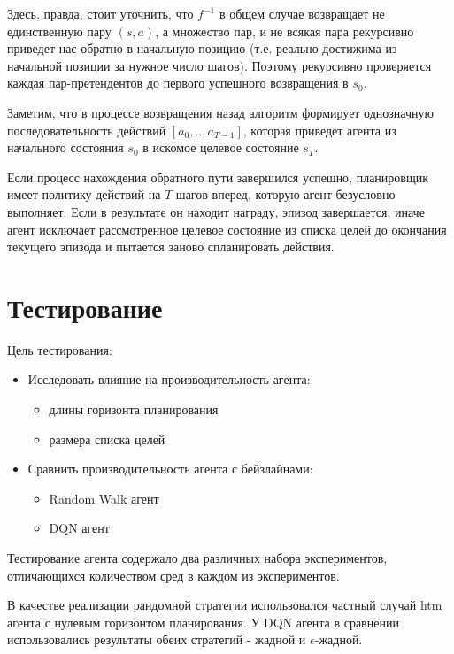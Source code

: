 \documentclass[a4paper]{article}
\begin{document}
Здесь, правда, стоит уточнить, что $f^{-1}$ в общем случае возвращает не единственную пару $(s, a)$, а множество пар, и не всякая пара рекурсивно приведет нас обратно в начальную позицию (т.е. реально достижима из начальной позиции за нужное число шагов). Поэтому рекурсивно проверяется каждая пар-претендентов до первого успешного возвращения в $s_0$.

Заметим, что в процессе возвращения назад алгоритм формирует однозначную последовательность действий $[a_0, .. , a_{T-1}]$, которая приведет агента из начального состояния $s_0$ в искомое целевое состояние $s_T$.

Если процесс нахождения обратного пути завершился успешно, планировщик имеет политику действий на $T$ шагов вперед, которую агент безусловно выполняет. Если в результате он находит награду, эпизод завершается, иначе агент исключает рассмотренное целевое состояние из списка целей до окончания текущего эпизода и пытается заново спланировать действия.

\section{Тестирование}

Цель тестирования:

\begin{itemize}
    \item Исследовать влияние на производительность агента:
    \begin{itemize}
        \item длины горизонта планирования
        \item размера списка целей
    \end{itemize}
    
    \item Сравнить производительность агента с бейзлайнами:
    \begin{itemize}
        \item Random Walk агент
        \item DQN агент
    \end{itemize}
\end{itemize}

Тестирование агента содержало два различных набора экспериментов, отличающихся количеством сред в каждом из экспериментов.

В качестве реализации рандомной стратегии использовался частный случай htm агента с нулевым горизонтом планирования. У DQN агента в сравнении использовались результаты обеих стратегий - жадной и $\epsilon$-жадной.
\end{document}
